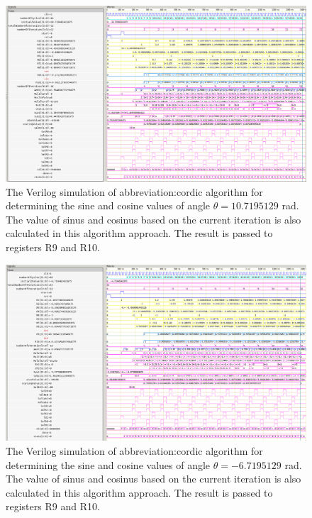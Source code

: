 \documentclass[a4paper, twoside, 11pt]{article}
\begin{document}
        \begin{figure}[htbp!]
            \centering
            \includegraphics[width=1\textwidth]{src/png/inverted/cordic-verilog-whole-sim-10_719.png}
            \caption{The Verilog simulation of \gls{abbreviation:cordic} algorithm for determining the sine and cosine values of angle $\theta = 10.7195129$ rad. The value of sinus and cosinus based on the current iteration is also calculated in this algorithm approach. The result is passed to registers R9 and R10.}
            \label{fig:cordic-verilog-whole-sim-10_719}
        \end{figure}

        \begin{figure}[htbp!]
            \centering
            \includegraphics[width=1\textwidth]{src/png/inverted/cordic-verilog-whole-sim_minus_6_7195129.png}
            \caption{The Verilog simulation of \gls{abbreviation:cordic} algorithm for determining the sine and cosine values of angle $\theta = - 6.7195129$ rad. The value of sinus and cosinus based on the current iteration is also calculated in this algorithm approach. The result is passed to registers R9 and R10.}
            \label{fig:cordic-verilog-whole-sim_minus_6_7195129}
        \end{figure}
\end{document}
